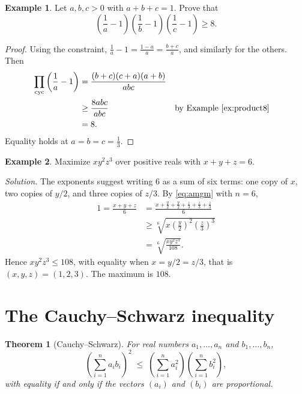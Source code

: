\documentclass[11pt,a4paper]{article}
\newtheorem{theorem}{Theorem}[section]
\theoremstyle{definition}
\newtheorem{example}{Example}[section]
\theoremstyle{remark}
\begin{document}
\begin{example}\label{ex:sum1}
Let $a, b, c > 0$ with $a + b + c = 1$. Prove that
\[
  \left(\frac{1}{a} - 1\right)\left(\frac{1}{b} - 1\right)\left(\frac{1}{c} - 1\right) \geq 8.
\]
\end{example}

\begin{proof}
Using the constraint, $\frac{1}{a} - 1 = \frac{1 - a}{a} = \frac{b + c}{a}$, and similarly for the others. Then
\begin{align*}
  \prod_{\text{cyc}} \left(\frac{1}{a} - 1\right)
    &= \frac{(b + c)(c + a)(a + b)}{abc} \\
    &\geq \frac{8abc}{abc} && \text{by Example~\ref{ex:product8}} \\
    &= 8.
\end{align*}
Equality holds at $a = b = c = \tfrac13$.
\end{proof}

\begin{example}\label{ex:weighted}
Maximize $xy^2z^3$ over positive reals with $x + y + z = 6$.
\end{example}

\noindent\textit{Solution.} The exponents suggest writing $6$ as a sum of six terms: one copy of $x$, two copies of $y/2$, and three copies of $z/3$. By \eqref{eq:amgm} with $n = 6$,
\begin{align*}
  1 = \frac{x + y + z}{6}
    &= \frac{x + \frac{y}{2} + \frac{y}{2} + \frac{z}{3} + \frac{z}{3} + \frac{z}{3}}{6} \\
    &\geq \sqrt[6]{x \left(\frac{y}{2}\right)^{2} \left(\frac{z}{3}\right)^{3}} \\
    &= \sqrt[6]{\frac{xy^2z^3}{108}}.
\end{align*}
Hence $xy^2z^3 \leq 108$, with equality when $x = y/2 = z/3$, that is $(x, y, z) = (1, 2, 3)$. The maximum is $108$.

\section{The Cauchy--Schwarz inequality}

\begin{theorem}[Cauchy--Schwarz]\label{thm:cs}
For real numbers $a_1, \dots, a_n$ and $b_1, \dots, b_n$,
\begin{equation}\label{eq:cs}
  \left(\sum_{i=1}^{n} a_i b_i\right)^{2} \;\leq\; \left(\sum_{i=1}^{n} a_i^2\right)\left(\sum_{i=1}^{n} b_i^2\right),
\end{equation}
with equality if and only if the vectors $(a_i)$ and $(b_i)$ are proportional.
\end{theorem}
\end{document}
